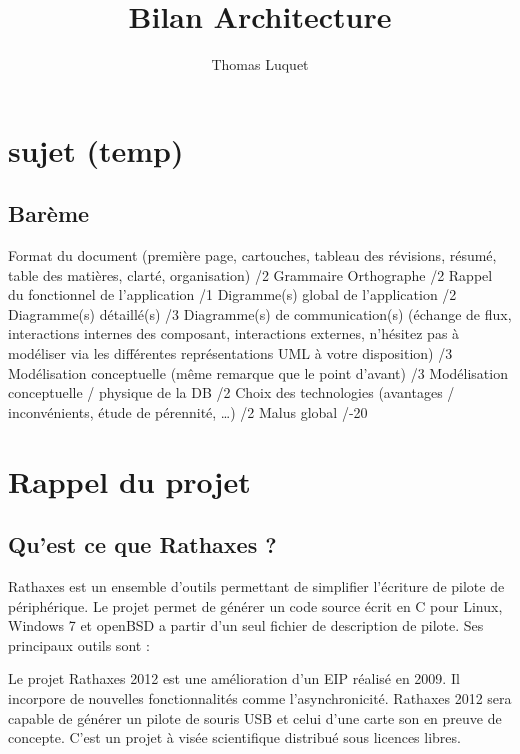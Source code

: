 \documentclass{rtxreport}
\author{Thomas Luquet}
\title{Bilan Architecture}
\begin{document}
\maketitle

\rtxmaketitleblock

\tableofcontents


\chapter{sujet (temp)}

\section{Barème}

Format du document (première page, cartouches, tableau des révisions, résumé, table des matières, clarté, organisation) /2
Grammaire Orthographe /2
Rappel du fonctionnel de l'application /1
Digramme(s) global de l'application /2
Diagramme(s) détaillé(s) /3
Diagramme(s) de communication(s) (échange de flux, interactions internes des composant, interactions externes, n'hésitez pas à modéliser via les différentes représentations UML à votre disposition) /3
Modélisation conceptuelle (même remarque que le point d'avant) /3
Modélisation conceptuelle / physique de la DB /2
Choix des technologies (avantages / inconvénients, étude de pérennité, …) /2
Malus global /-20

\chapter{Rappel du projet}

\section{Qu'est ce que Rathaxes ?} 

Rathaxes est un ensemble d'outils permettant de simplifier l'écriture de pilote de périphérique. Le projet permet de générer un code source écrit en C pour Linux, Windows 7 et openBSD a partir d'un seul fichier de description de pilote.
Ses principaux outils sont :

Le projet Rathaxes 2012 est une amélioration d'un EIP réalisé en 2009. Il incorpore de nouvelles fonctionnalités comme l’asynchronicité. 
Rathaxes 2012 sera capable de générer un pilote de souris USB et celui d'une carte son en preuve de concepte.
C'est un projet à visée scientifique distribué sous licences libres.
\end{document}
